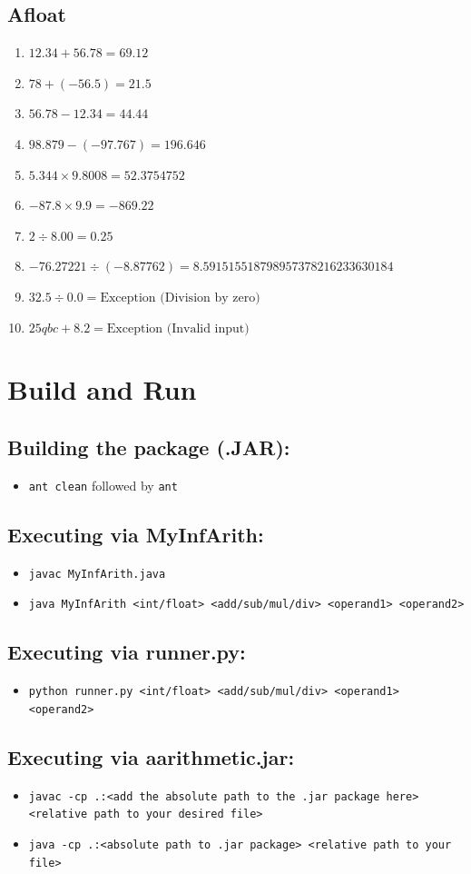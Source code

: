 \documentclass[12pt]{article}
\begin{document}
\subsection{Afloat}
\begin{enumerate}
    \item \(12.34 + 56.78 = 69.12\)
    \item \(78 + (-56.5) = 21.5\)
    \item \(56.78 - 12.34 = 44.44\)
    \item \(98.879 - (-97.767) = 196.646\)
    \item \(5.344 \times 9.8008 = 52.3754752\)
    \item \(-87.8 \times 9.9 = -869.22\)
    \item \(2 \div 8.00 = 0.25\)
    \item \(-76.27221 \div (-8.87762) = 8.591515518798957378216233630184\)
    \item \(32.5 \div 0.0 = \text{Exception (Division by zero)}\)
    \item \(25qbc + 8.2 = \text{Exception (Invalid input)}\)
\end{enumerate}

\section{Build and Run}

\subsection{Building the package (.JAR):}
\begin{itemize}
    \item \texttt{ant clean} followed by \texttt{ant}
\end{itemize}

\subsection{Executing via MyInfArith:}
\begin{itemize}
    \item \texttt{javac MyInfArith.java}
    \item \texttt{java MyInfArith <int/float> <add/sub/mul/div> <operand1> <operand2>}
\end{itemize}

\subsection{Executing via runner.py:} 
\begin{itemize}
    \item \texttt{python runner.py <int/float> <add/sub/mul/div> <operand1> <operand2>}
\end{itemize}

\subsection{Executing via aarithmetic.jar:} 
\begin{itemize}
    \item \texttt{javac -cp .:<add the absolute path to the .jar package here> <relative path to your desired file>}
    \item \texttt{java -cp .:<absolute path to .jar package> <relative path to your file>}
\end{itemize}
\end{document}
